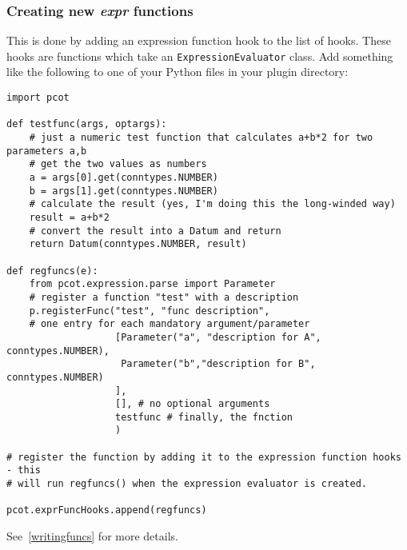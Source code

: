 \subsubsection{Creating new \emph{expr} functions}
This is done by adding an expression function hook to the list of hooks. These
hooks are functions which take an \texttt{ExpressionEvaluator} class. Add something
like the following to one of your Python files in your plugin directory:
\begin{lstlisting}
import pcot

def testfunc(args, optargs):
    # just a numeric test function that calculates a+b*2 for two parameters a,b
    # get the two values as numbers
    a = args[0].get(conntypes.NUMBER)
    b = args[1].get(conntypes.NUMBER)
    # calculate the result (yes, I'm doing this the long-winded way)
    result = a+b*2
    # convert the result into a Datum and return
    return Datum(conntypes.NUMBER, result)

def regfuncs(e):
    from pcot.expression.parse import Parameter
    # register a function "test" with a description
    p.registerFunc("test", "func description",
    # one entry for each mandatory argument/parameter
                   [Parameter("a", "description for A", conntypes.NUMBER),
                    Parameter("b","description for B", conntypes.NUMBER)
                   ],
                   [], # no optional arguments
                   testfunc # finally, the fnction
                   )

# register the function by adding it to the expression function hooks - this
# will run regfuncs() when the expression evaluator is created.

pcot.exprFuncHooks.append(regfuncs)
\end{lstlisting}
See~\ref{writingfuncs} for more details.
